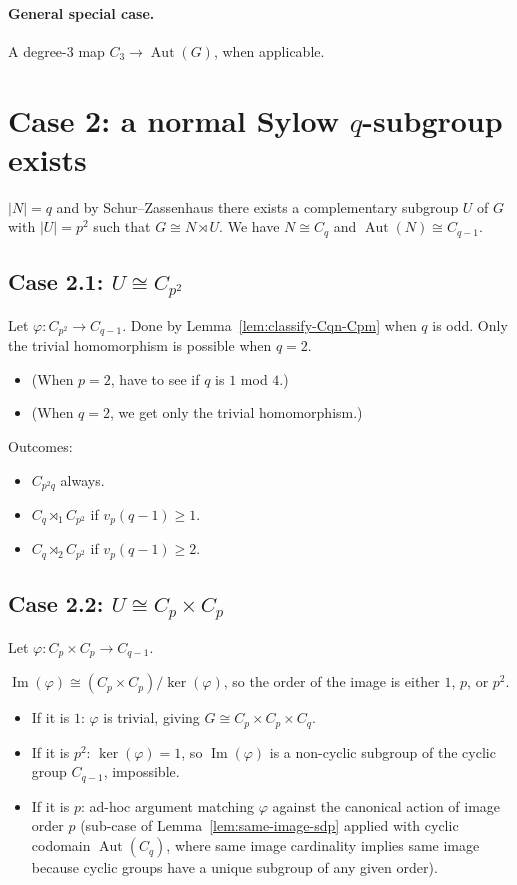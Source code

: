 \paragraph{General special case.} A degree-$3$ map $C_3 \to
\operatorname{Aut}(G)$, when applicable.

\section{Case 2: a normal Sylow $q$-subgroup exists}

$|N| = q$ and by Schur--Zassenhaus there exists a complementary subgroup $U$
of $G$ with $|U| = p^2$ such that $G \cong N \rtimes U$. We have $N \cong
C_q$ and $\operatorname{Aut}(N) \cong C_{q-1}$.

\subsection{Case 2.1: $U \cong C_{p^2}$}

Let $\varphi : C_{p^2} \to C_{q-1}$. Done by
Lemma~\ref{lem:classify-Cqn-Cpm} when $q$ is odd. Only the trivial
homomorphism is possible when $q = 2$.

\begin{itemize}
    \item (When $p = 2$, have to see if $q$ is $1$ mod $4$.)
    \item (When $q = 2$, we get only the trivial homomorphism.)
\end{itemize}

Outcomes:
\begin{itemize}
    \item $C_{p^2 q}$ always.
    \item $C_q \rtimes_1 C_{p^2}$ if $v_p(q - 1) \geq 1$.
    \item $C_q \rtimes_2 C_{p^2}$ if $v_p(q - 1) \geq 2$.
\end{itemize}

\subsection{Case 2.2: $U \cong C_p \times C_p$}

Let $\varphi : C_p \times C_p \to C_{q-1}$.

$\operatorname{Im}(\varphi) \cong (C_p \times C_p) / \ker(\varphi)$, so the
order of the image is either $1$, $p$, or $p^2$.
\begin{itemize}
    \item If it is $1$: $\varphi$ is trivial, giving
        $G \cong C_p \times C_p \times C_q$.
    \item If it is $p^2$: $\ker(\varphi) = 1$, so $\operatorname{Im}(\varphi)$
        is a non-cyclic subgroup of the cyclic group $C_{q-1}$, impossible.
    \item If it is $p$: ad-hoc argument matching $\varphi$ against the
        canonical action of image order $p$ (sub-case of
        Lemma~\ref{lem:same-image-sdp} applied with cyclic codomain
        $\operatorname{Aut}(C_q)$, where same image cardinality implies same
        image because cyclic groups have a unique subgroup of any given order).
\end{itemize}

